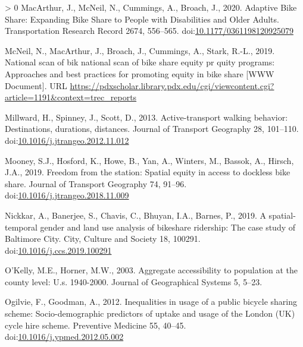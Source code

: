 \documentclass[]{elsarticle} %
\newlength{\cslhangindent}
\newenvironment{CSLReferences}[3] %
 {%
  \setlength{\parindent}{0pt}
  \ifodd #1 \everypar{\setlength{\hangindent}{\cslhangindent}}\ignorespaces\fi
  \ifnum #2 > 0
  \setlength{\parskip}{#2\baselineskip}
  \fi
 }%
 {}
\begin{document}
\begin{CSLReferences}{1}{0}
\leavevmode\hypertarget{ref-macarthurAdaptiveBikeShare2020}{}%
MacArthur, J., McNeil, N., Cummings, A., Broach, J., 2020. Adaptive
{Bike Share}: {Expanding Bike Share} to {People} with {Disabilities} and
{Older Adults}. Transportation Research Record 2674, 556--565.
doi:\href{https://doi.org/10.1177/0361198120925079}{10.1177/0361198120925079}

\leavevmode\hypertarget{ref-trec2019}{}%
McNeil, N., MacArthur, J., Broach, J., Cummings, A., Stark, R.-L., 2019.
National scan of bik national scan of bike share equity pr quity
programs: Approaches and best practices for promoting equity in bike
share {[}WWW Document{]}. URL
\url{https://pdxscholar.library.pdx.edu/cgi/viewcontent.cgi?article=1191\&context=trec_reports}

\leavevmode\hypertarget{ref-millwardActivetransportWalkingBehavior2013}{}%
Millward, H., Spinney, J., Scott, D., 2013. Active-transport walking
behavior: Destinations, durations, distances. Journal of Transport
Geography 28, 101--110.
doi:\href{https://doi.org/10.1016/j.jtrangeo.2012.11.012}{10.1016/j.jtrangeo.2012.11.012}

\leavevmode\hypertarget{ref-mooneyFreedomStationSpatial2019}{}%
Mooney, S.J., Hosford, K., Howe, B., Yan, A., Winters, M., Bassok, A.,
Hirsch, J.A., 2019. Freedom from the station: {Spatial} equity in access
to dockless bike share. Journal of Transport Geography 74, 91--96.
doi:\href{https://doi.org/10.1016/j.jtrangeo.2018.11.009}{10.1016/j.jtrangeo.2018.11.009}

\leavevmode\hypertarget{ref-nickkarSpatialtemporalGenderLand2019}{}%
Nickkar, A., Banerjee, S., Chavis, C., Bhuyan, I.A., Barnes, P., 2019. A
spatial-temporal gender and land use analysis of bikeshare ridership:
{The} case study of {Baltimore City}. City, Culture and Society 18,
100291.
doi:\href{https://doi.org/10.1016/j.ccs.2019.100291}{10.1016/j.ccs.2019.100291}

\leavevmode\hypertarget{ref-okelly2003aggregate}{}%
O'Kelly, M.E., Horner, M.W., 2003. Aggregate accessibility to population
at the county level: U.s. 1940-2000. Journal of Geographical Systems 5,
5--23.

\leavevmode\hypertarget{ref-ogilvieInequalitiesUsagePublic2012}{}%
Ogilvie, F., Goodman, A., 2012. Inequalities in usage of a public
bicycle sharing scheme: {Socio}-demographic predictors of uptake and
usage of the {London} ({UK}) cycle hire scheme. Preventive Medicine 55,
40--45.
doi:\href{https://doi.org/10.1016/j.ypmed.2012.05.002}{10.1016/j.ypmed.2012.05.002}


\end{CSLReferences}
\end{document}

